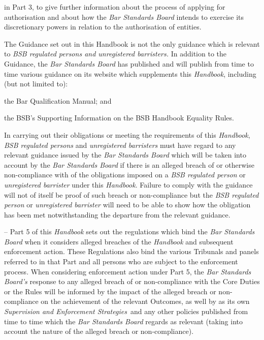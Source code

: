\begin{numlist}
\begin{alphlist}
\begin{romlist}
\item in Part 3, to give further information about the process of applying
for authorisation and about how the \emph{Bar Standards Board} intends
to exercise its discretionary powers in relation to the authorisation of
entities.
\end{romlist}
\item The Guidance set out in this Handbook is not the only guidance which
is relevant to \emph{BSB \emph{regulated persons and unregistered
barristers}.} In addition to the Guidance, the \emph{Bar Standards
Board} has published and will publish from time to time various guidance
on its website which supplements this \emph{Handbook}, including (but
not limited to):
\begin{romlist}
\item the Bar Qualification Manual; and

\item the BSB's Supporting Information on the BSB Handbook Equality Rules.
\end{romlist}
\item In carrying out their obligations or meeting the requirements of this
\emph{Handbook}, \emph{BSB regulated persons} and \emph{unregistered
barristers} must have regard to any relevant guidance issued by the
\emph{Bar Standards Board} which will be taken into account by the
\emph{Bar Standards Board} if there is an alleged breach of or otherwise
non-compliance with of the obligations imposed on a \emph{BSB regulated
person} or \emph{unregistered barrister} under this \emph{Handbook}.
Failure to comply with the guidance will not of itself be proof of such
breach or non-compliance but the \emph{BSB regulated person} or
\emph{unregistered barrister} will need to be able to show how the
obligation has been met notwithstanding the departure from the relevant
guidance.\end{alphlist}
\item {} -- Part 5 of this \emph{Handbook} sets out the
regulations which bind the \emph{Bar Standards \emph{Board}} when it
considers alleged breaches of the \emph{Handbook} and subsequent
enforcement action. These Regulations also bind the various Tribunals
and panels referred to in that Part and all persons who are subject to
the enforcement process. When considering enforcement action under Part
5, the \emph{Bar Standards Board's} response to any alleged breach of or
non-compliance with the Core Duties or the Rules will be informed by the
impact of the alleged breach or non-compliance on the achievement of the
relevant Outcomes, as well by as its own \emph{Supervision and
Enforcement Strategies}~and any other policies published from time to
time which the \emph{Bar Standards Board} regards as relevant (taking
into account the nature of the alleged breach or non-compliance).
\end{numlist}


